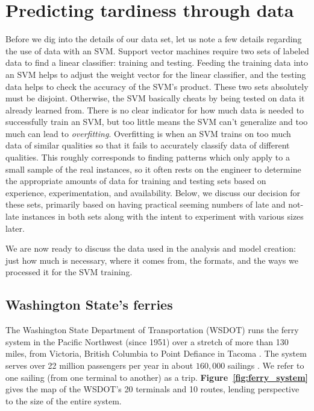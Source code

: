 \documentclass[11pt]{article} %
\begin{document}
\section{Predicting tardiness through data}
\label{sec:problem}
Before we dig into the details of our data set, let us note a few details regarding
the use of data with an SVM.  Support vector machines require two sets of labeled 
data to find a linear classifier:
training and testing. Feeding the training data into an SVM helps to adjust 
the weight vector for the linear classifier, and the testing data helps 
to check the accuracy of the SVM's product.  These two sets absolutely must 
be disjoint. Otherwise, the SVM basically cheats by being
tested on data it already learned from. There is no clear indicator for how much 
data is needed to successfully train an SVM, but too little means the SVM can't 
generalize and too much can lead to \textit{overfitting}. Overfitting is when an 
SVM trains on too much data of similar qualities so that it fails to accurately
classify data of different qualities. This roughly corresponds to finding patterns
which only apply to a small sample of the real instances, so it often rests 
on the engineer to determine the appropriate amounts of data for training
and testing sets based on experience, experimentation, and availability. Below,
we discuss our decision for these sets, primarily based on having practical
seeming numbers of late and not-late instances in both sets along with the intent
to experiment with various sizes later.

We are now ready to discuss the data used in the analysis and model creation: 
just how much is necessary, where it comes from, the formats, and the ways we
processed it for the SVM training.


\subsection{Washington State's ferries}
\label{sec:wsdot}
The Washington State Department of Transportation (WSDOT) runs the ferry system
in the Pacific Northwest (since 1951) over a stretch of more than 130 miles, from 
Victoria, British Columbia to Point Defiance in Tacoma \cite{wsdotFleet}. The system 
serves over 22 million passengers per year in about $160,000$ sailings 
\cite{wsfTraffic}.  We refer to one sailing (from one terminal to another) as a 
trip.  \textbf{Figure~\ref{fig:ferry_system}} gives the map of the WSDOT's 20 
terminals and 10 routes, lending perspective to the size of the entire system.
\end{document}
